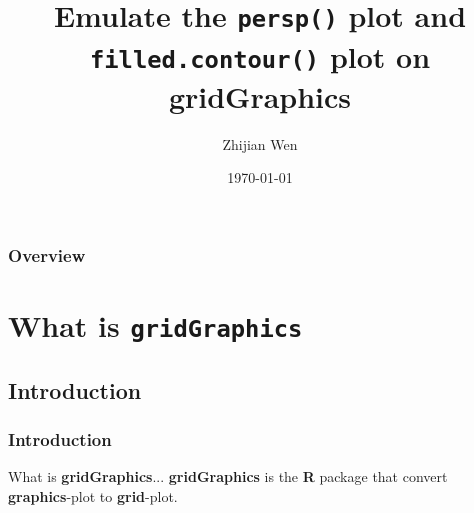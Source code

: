 \documentclass{beamer}
\title[Short title]{
Emulate the \texttt{persp()} plot and \texttt{filled.contour()} plot on \textbf{gridGraphics}
} %
\author{Zhijian Wen} %
\institute[UOA] %
{
University of Auckland \\ %
\medskip
\textit{jwen246@aucklanduni.ac.nz} %
}
\date{\today} %
\begin{document}


\begin{frame}
\titlepage %
\end{frame}

\begin{frame}
\frametitle{Overview} %
\tableofcontents %
\end{frame}


\section{What is \texttt{gridGraphics}}

\subsection{Introduction} 
\begin{frame}
\frametitle{Introduction}
\begin{block}{What is \textbf{gridGraphics}...}
\textbf{gridGraphics} is the \textbf{R} package that convert \textbf{graphics}-plot to \textbf{grid}-plot.
\end{block}

\end{frame}

\end{document}
